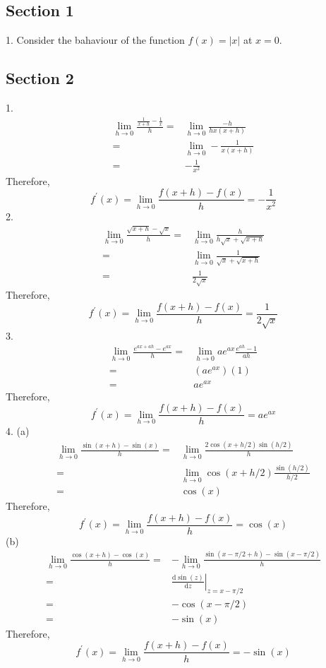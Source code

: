 \subsection{Section 1}
1. Consider the bahaviour of the function $f(x)=|x|$ at $x=0$.

\subsection{Section 2}
1.
\begin{align*}
    \lim_{h\to0}\frac{\frac{1}{x+h}-\frac{1}{x}}{h}
    =&\lim_{h\to0}\frac{-h}{hx(x+h)}\\
    =&\lim_{h\to0}-\frac{1}{x(x+h)}\\
    =&-\frac{1}{x^2}
\end{align*}
Therefore,
$$f^\prime(x)=\lim_{h\to0}\frac{f(x+h)-f(x)}{h}=-\frac{1}{x^2}$$
2.
\begin{align*}
    \lim_{h\to0}\frac{\sqrt{x+h}-\sqrt{x}}{h}
    =&\lim_{h\to0}\frac{h}{h\sqrt{x}+\sqrt{x+h}}\\
    =&\lim_{h\to0}\frac{1}{\sqrt{x}+\sqrt{x+h}}\\
    =&\frac{1}{2\sqrt{x}}
\end{align*}
Therefore,
$$f^\prime(x)=\lim_{h\to0}\frac{f(x+h)-f(x)}{h}=\frac{1}{2\sqrt{x}}$$
3.
\begin{align*}
    \lim_{h\to0}\frac{e^{ax+ah}-e^{ax}}{h}
    =&\lim_{h\to0}ae^{ax}\frac{e^{ah}-1}{ah}\\
    =&(ae^{ax})(1)\\
    =&ae^{ax}
\end{align*}
Therefore,
$$f^\prime(x)=\lim_{h\to0}\frac{f(x+h)-f(x)}{h}=ae^{ax}$$
4. (a)
\begin{align*}
    \lim_{h\to0}\frac{\sin(x+h)-\sin(x)}{h}
    =&\lim_{h\to0}\frac{2\cos(x+h/2)\sin(h/2)}{h}\\
    =&\lim_{h\to0}\cos(x+h/2)\frac{\sin(h/2)}{h/2}\\
    =&\cos(x)
\end{align*}
Therefore,
$$f^\prime(x)=\lim_{h\to0}\frac{f(x+h)-f(x)}{h}=\cos(x)$$
(b)
\begin{align*}
    \lim_{h\to0}\frac{\cos(x+h)-\cos(x)}{h}
    =&-\lim_{h\to0}\frac{\sin(x-\pi/2+h)-\sin(x-\pi/2)}{h}\\
    =&\left.\frac{\mathrm d\sin(z)}{\mathrm dz}\right|_{z=x-\pi/2}\\
    =&-\cos(x-\pi/2)\\
    =&-\sin(x)
\end{align*}
Therefore,
$$f^\prime(x)=\lim_{h\to0}\frac{f(x+h)-f(x)}{h}=-\sin(x)$$
